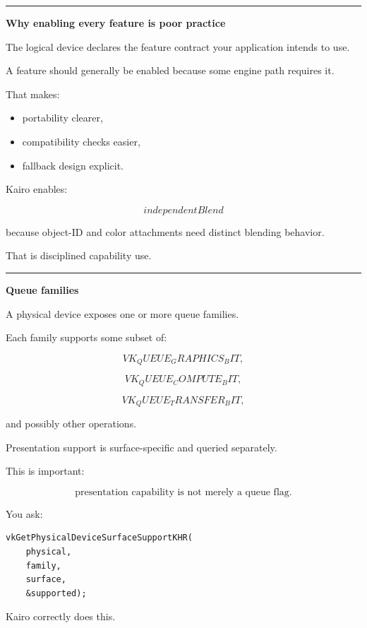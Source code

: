 \begin{center}\rule{0.5\linewidth}{0.5pt}\end{center}

\textbf{Why enabling every feature is poor practice}

The logical device declares the feature contract your application intends to use.

A feature should generally be enabled because some engine path requires it.

That makes:

\begin{itemize}
\tightlist
\item
  portability clearer,
\item
  compatibility checks easier,
\item
  fallback design explicit.
\end{itemize}

Kairo enables:

\[
\boxed{
independentBlend
}
\]

because object-ID and color attachments need distinct blending behavior.

That is disciplined capability use.

\begin{center}\rule{0.5\linewidth}{0.5pt}\end{center}

\textbf{Queue families}

A physical device exposes one or more queue families.

Each family supports some subset of:

\[
VK_QUEUE_GRAPHICS_BIT,
\]

\[
VK_QUEUE_COMPUTE_BIT,
\]

\[
VK_QUEUE_TRANSFER_BIT,
\]

and possibly other operations.

Presentation support is surface-specific and queried separately.

This is important:

\[
\boxed{
\text{presentation capability is not merely a queue flag}.
}
\]

You ask:

\begin{verbatim}
vkGetPhysicalDeviceSurfaceSupportKHR(
    physical,
    family,
    surface,
    &supported);
\end{verbatim}

Kairo correctly does this.

